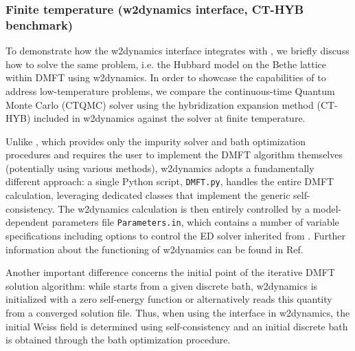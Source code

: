 \documentclass[edipack_sp.tex]{subfiles}
\begin{document}
\subsubsection{Finite temperature (w2dynamics interface, CT-HYB benchmark)}\label{SecExamplesBetheDMFTW2D}
To demonstrate how the w2dynamics interface integrates with  \NAME, we briefly discuss how to solve the same problem, i.e. the Hubbard model on the Bethe lattice within DMFT using w2dynamics. 
In order to showcase the capabilities of \NAME to address low-temperature problems, we compare the continuous-time Quantum Monte Carlo (CTQMC) solver using the hybridization expansion method (CT-HYB) included in w2dynamics against the \NAME solver at finite temperature.  

Unlike \NAME, which provides only the impurity solver and bath optimization procedures and requires the user to implement the DMFT algorithm themselves (potentially using various methods), w2dynamics adopts a fundamentally different approach: a single Python script, {\tt DMFT.py}, handles the entire DMFT calculation, leveraging dedicated classes that implement the generic self-consistency. The w2dynamics calculation is then entirely controlled by a model-dependent parameters file {\tt Parameters.in}, which contains a number of variable specifications including options to control the ED solver inherited from \NAME. Further information about the functioning of w2dynamics can be found in Ref. \cite{Wallerberger2019CPC}           

Another important difference concerns the initial point of the iterative DMFT solution algorithm: while \NAME starts from a given discrete bath, w2dynamics is initialized with a zero self-energy function or alternatively reads this quantity from a converged solution file. Thus, when using the \NAME interface in w2dynamics, the initial Weiss field is determined using self-consistency and  an initial discrete bath is obtained through the \NAME bath optimization procedure. 
\end{document}
